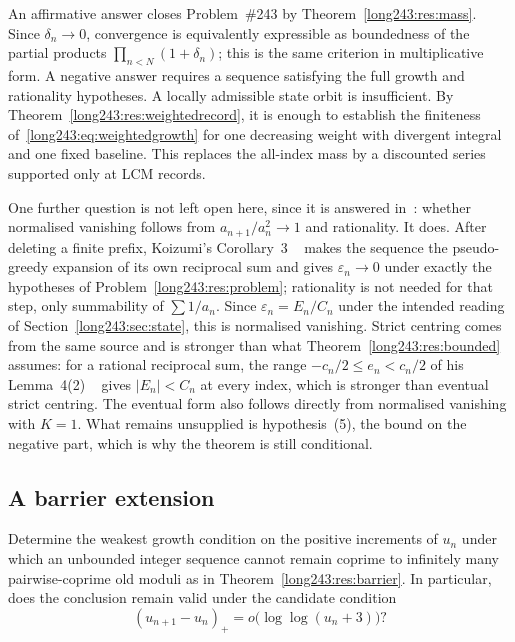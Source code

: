 \noindent An affirmative answer closes Problem~\#243 by
Theorem~\ref{long243:res:mass}.  Since $\delta_n\to0$, convergence is equivalently
expressible as boundedness of the partial products
$\prod_{n<N}(1+\delta_n)$; this is the same criterion in multiplicative form.
A negative answer requires a sequence satisfying the full growth and
rationality hypotheses. A locally admissible state orbit is insufficient.
By Theorem~\ref{long243:res:weightedrecord}, it is enough to establish the finiteness
of~\eqref{long243:eq:weightedgrowth} for one decreasing weight with divergent
integral and one fixed baseline. This replaces the all-index mass by a
discounted series supported only at LCM records.

\begin{remark}
One further question is not left open here, since it is answered
in~\cite{koizumi2025}: whether normalised vanishing follows from
$a_{n+1}/a_n^{2}\to1$ and rationality.  It does.  After
deleting a finite prefix, Koizumi's Corollary~3
~\cite[p.~9]{koizumi2025} makes the sequence the pseudo-greedy expansion of its
own reciprocal sum and gives $\varepsilon_n\to0$ under exactly the hypotheses of
Problem~\ref{long243:res:problem}; rationality is not needed for that step, only
summability of $\sum1/a_n$.  Since $\varepsilon_n=E_n/C_n$ under the intended
reading of Section~\ref{long243:sec:state}, this is normalised vanishing.  Strict
centring comes from the same source and is stronger than what
Theorem~\ref{long243:res:bounded} assumes: for a rational reciprocal sum, the range
$-c_n/2\le e_n<c_n/2$ of his Lemma~4(2)
~\cite[pp.~11--12]{koizumi2025} gives $|E_n|<C_n$ at every index, which is stronger
than eventual strict centring.  The eventual form also follows directly from
normalised vanishing with $K=1$.  What remains unsupplied is hypothesis~(5), the bound
on the negative part, which is why the theorem is still conditional.
\end{remark}

\subsection{A barrier extension}

\begin{problem}\label{long243:res:variablerise}
Determine the weakest growth condition on the positive increments of $u_n$
under which an unbounded integer sequence cannot remain coprime to infinitely
many pairwise-coprime old moduli as in Theorem~\ref{long243:res:barrier}.  In
particular, does the conclusion remain valid under the candidate condition
\[
 (u_{n+1}-u_n)_+=o\bigl(\log\log(u_n+3)\bigr)?
\]
\end{problem}

